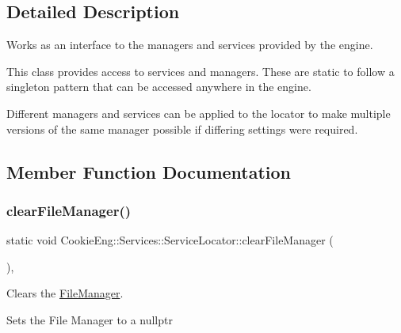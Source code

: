 \subsection{Detailed Description}
Works as an interface to the managers and services provided by the engine. 

This class provides access to services and managers. These are static to follow a singleton pattern that can be accessed anywhere in the engine.

Different managers and services can be applied to the locator to make multiple versions of the same manager possible if differing settings were required. 

\subsection{Member Function Documentation}
\mbox{\label{class_cookie_eng_1_1_services_1_1_service_locator_a648c75987f9d4380475b3c2056f6d963}} 
\subsubsection{\texorpdfstring{clear\+File\+Manager()}{clearFileManager()}}
{\footnotesize\ttfamily static void Cookie\+Eng\+::\+Services\+::\+Service\+Locator\+::clear\+File\+Manager (\begin{DoxyParamCaption}{ }\end{DoxyParamCaption})\hspace{0.3cm}{\ttfamily [inline]}, {\ttfamily [static]}}



Clears the \hyperlink{class_cookie_eng_1_1_services_1_1_file_manager}{File\+Manager}. 

Sets the File Manager to a nullptr \mbox{\label{class_cookie_eng_1_1_services_1_1_service_locator_a1603a231c16663c30ed40afd49dffb72}} 
